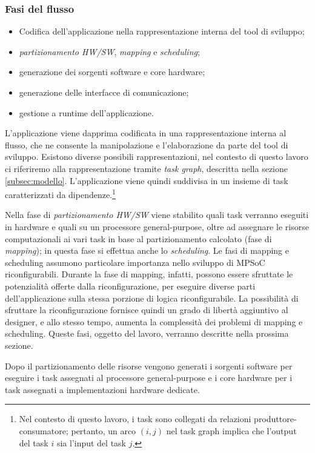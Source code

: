 \subsubsection{Fasi del flusso}
\begin{itemize}
  \item Codifica dell'applicazione nella rappresentazione interna del tool di sviluppo;
  \item \emph{partizionamento HW/SW}, \emph{mapping} e \emph{scheduling};
  \item generazione dei sorgenti software e core hardware;
  \item generazione delle interfacce di comunicazione;
  \item gestione a runtime dell'applicazione.
\end{itemize}
L'applicazione viene dapprima codificata in una
rappresentazione interna al flusso, che ne consente la manipolazione e
l'elaborazione da parte del tool di sviluppo. Esistono diverse possibili
rappresentazioni, nel contesto di questo lavoro ci riferiremo alla
rappresentazione tramite \emph{task graph}, descritta nella sezione
\ref{subsec:modello}. L'applicazione viene quindi suddivisa in un
insieme di task caratterizzati da dipendenze.\footnote{Nel contesto di questo
lavoro, i task sono collegati da relazioni produttore-consumatore; pertanto, un arco $(i,j)$ nel task graph implica che
l'output del task $i$ sia l'input del task $j$.}

Nella fase di \emph{partizionamento HW/SW} viene stabilito quali task verranno
eseguiti in hardware e quali su un processore general-purpose, oltre ad assegnare le risorse computazionali ai vari task in
base al partizionamento calcolato (fase di
\emph{mapping}); in questa fase si effettua anche lo
\emph{scheduling}. Le fasi di mapping e scheduling assumono particolare
importanza nello sviluppo di \ac{MPSoC} riconfigurabili. Durante la fase di mapping,
infatti, possono essere sfruttate le potenzialit\`a offerte dalla riconfigurazione,
per eseguire diverse parti dell'applicazione sulla stessa porzione di logica riconfigurabile.
La possibilit\`a di sfruttare la riconfigurazione fornisce quindi un grado di libert\`a aggiuntivo
al designer, e allo stesso tempo, aumenta la complessit\`a dei problemi di mapping e scheduling.
Queste fasi, oggetto del lavoro, verranno descritte nella prossima sezione.

Dopo il partizionamento delle risorse vengono generati i sorgenti software per
eseguire i task assegnati al processore general-purpose e i core hardware per i
task assegnati a implementazioni hardware dedicate.

